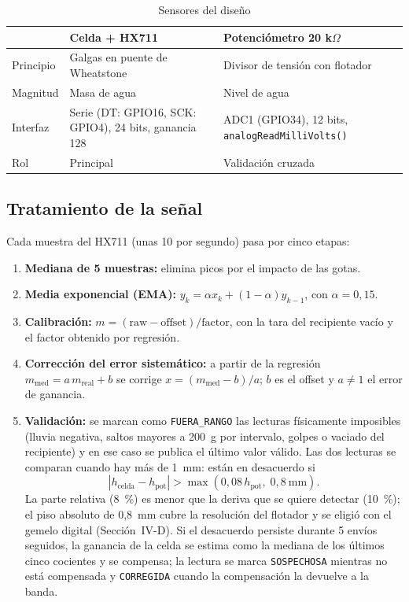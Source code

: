 \documentclass[10pt,twocolumn,letterpaper]{article}
\begin{document}
\begin{table}[t]
\caption{Sensores del diseño}
\label{tab:sens}
\centering\footnotesize
\begin{tabularx}{\columnwidth}{@{}lXX@{}}
\toprule
 & Celda + HX711 & Potenciómetro 20 k$\Omega$\\
\midrule
Principio & Galgas en puente de Wheatstone & Divisor de tensión con flotador\\
Magnitud & Masa de agua & Nivel de agua\\
Interfaz & Serie (DT: GPIO16, SCK: GPIO4), 24 bits, ganancia 128 & ADC1 (GPIO34), 12 bits, \texttt{analogReadMilliVolts()}\\
Rol & Principal & Validación cruzada\\
\bottomrule
\end{tabularx}
\end{table}

\subsection{Tratamiento de la señal}
Cada muestra del HX711 (unas 10 por segundo) pasa por cinco etapas:
\begin{enumerate}
\item \textbf{Mediana de 5 muestras:} elimina picos por el impacto de las gotas.
\item \textbf{Media exponencial (EMA):} $y_k=\alpha x_k+(1-\alpha)y_{k-1}$, con $\alpha=0{,}15$.
\item \textbf{Calibración:} $m=(\text{raw}-\text{offset})/\text{factor}$, con la tara del recipiente vacío y el factor obtenido por regresión.
\item \textbf{Corrección del error sistemático:} a partir de la regresión $m_{\text{med}}=a\,m_{\text{real}}+b$ se corrige $x=(m_{\text{med}}-b)/a$; $b$ es el offset y $a\neq1$ el error de ganancia.
\item \textbf{Validación:} se marcan como \texttt{FUERA\_RANGO} las lecturas físicamente imposibles (lluvia negativa, saltos mayores a 200~g por intervalo, golpes o vaciado del recipiente) y en ese caso se publica el último valor válido. Las dos lecturas se comparan cuando hay más de 1~mm: están en desacuerdo si
\begin{equation}
|h_{\text{celda}}-h_{\text{pot}}| > \max(0{,}08\,h_{\text{pot}},\;0{,}8~\text{mm}).
\end{equation}
La parte relativa (8~\%) es menor que la deriva que se quiere detectar (10~\%); el piso absoluto de 0,8~mm cubre la resolución del flotador y se eligió con el gemelo digital (Sección~IV-D). Si el desacuerdo persiste durante 5 envíos seguidos, la ganancia de la celda se estima como la mediana de los últimos cinco cocientes y se compensa; la lectura se marca \texttt{SOSPECHOSA} mientras no está compensada y \texttt{CORREGIDA} cuando la compensación la devuelve a la banda.
\end{enumerate}
\end{document}
